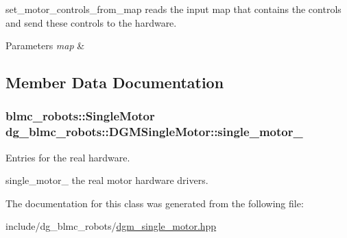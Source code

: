 set\+\_\+motor\+\_\+controls\+\_\+from\+\_\+map reads the input map that contains the controls and send these controls to the hardware. 


\begin{DoxyParams}{Parameters}
{\em map} & \\
\hline
\end{DoxyParams}


\subsection{Member Data Documentation}
\subsubsection[{\texorpdfstring{single\+\_\+motor\+\_\+}{single_motor_}}]{\setlength{\rightskip}{0pt plus 5cm}blmc\+\_\+robots\+::\+Single\+Motor dg\+\_\+blmc\+\_\+robots\+::\+D\+G\+M\+Single\+Motor\+::single\+\_\+motor\+\_\+\hspace{0.3cm}{\ttfamily [private]}}\hypertarget{classdg__blmc__robots_1_1DGMSingleMotor_abd548dc88f1ded74bafea823244de422}{}\label{classdg__blmc__robots_1_1DGMSingleMotor_abd548dc88f1ded74bafea823244de422}


Entries for the real hardware. 

single\+\_\+motor\+\_\+ the real motor hardware drivers. 

The documentation for this class was generated from the following file\+:\begin{DoxyCompactItemize}
\item 
include/dg\+\_\+blmc\+\_\+robots/\hyperlink{dgm__single__motor_8hpp}{dgm\+\_\+single\+\_\+motor.\+hpp}\end{DoxyCompactItemize}
